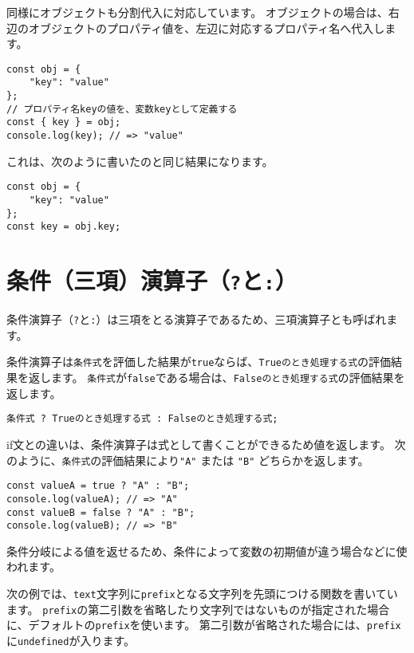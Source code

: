 同様にオブジェクトも分割代入に対応しています。
オブジェクトの場合は、右辺のオブジェクトのプロパティ値を、左辺に対応するプロパティ名へ代入します。

\begin{lstlisting}
const obj = {
    "key": "value"
};
// プロパティ名keyの値を、変数keyとして定義する
const { key } = obj;
console.log(key); // => "value"
\end{lstlisting}

これは、次のように書いたのと同じ結果になります。

\begin{lstlisting}
const obj = {
    "key": "value"
};
const key = obj.key;
\end{lstlisting}

\hypertarget{ternary-operator}{%
\section{\texorpdfstring{条件（三項）演算子（\texttt{?}と\texttt{:}）}{条件（三項）演算子（?と:）}}\label{ternary-operator}}

条件演算子（\texttt{?}と\texttt{:}）は三項をとる演算子であるため、三項演算子とも呼ばれます。

条件演算子は\texttt{条件式}を評価した結果が\texttt{true}ならば、\texttt{Trueのとき処理する式}の評価結果を返します。
\texttt{条件式}が\texttt{false}である場合は、\texttt{Falseのとき処理する式}の評価結果を返します。

\begin{lstlisting}
条件式 ? Trueのとき処理する式 : Falseのとき処理する式;
\end{lstlisting}

if文との違いは、条件演算子は式として書くことができるため値を返します。
次のように、\texttt{条件式}の評価結果により\texttt{"A"}
または \texttt{"B"} どちらかを返します。

\begin{lstlisting}
const valueA = true ? "A" : "B";
console.log(valueA); // => "A"
const valueB = false ? "A" : "B";
console.log(valueB); // => "B"
\end{lstlisting}

条件分岐による値を返せるため、条件によって変数の初期値が違う場合などに使われます。

次の例では、\texttt{text}文字列に\texttt{prefix}となる文字列を先頭につける関数を書いています。
\texttt{prefix}の第二引数を省略したり文字列ではないものが指定された場合に、デフォルトの\texttt{prefix}を使います。
第二引数が省略された場合には、\texttt{prefix}に\texttt{undefined}が入ります。

